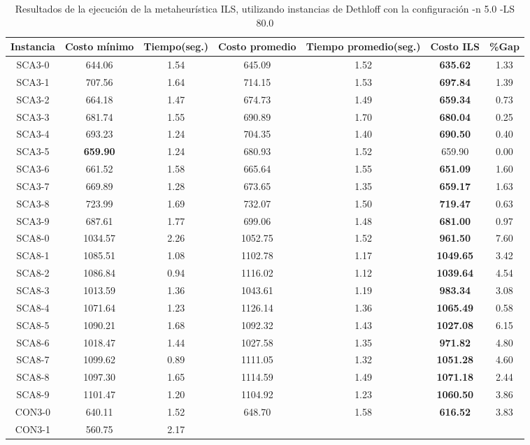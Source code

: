 \begin{table}[ht]
\caption{Resultados de la ejecución de la metaheurística ILS, utilizando instancias de Dethloff con la configuración -n 5.0 -LS 80.0}
\centering
\small
\begin{tabular}{c c c c c c c}
\hline\hline
Instancia & Costo mínimo & Tiempo(seg.) & Costo promedio & Tiempo promedio(seg.) & Costo ILS & \%Gap \\ [0.5ex]
\hline
SCA3-0 & 644.06 & 1.54 & 
645.09 & 1.52 & \bf{635.62} & 
1.33\\SCA3-1 & 707.56 & 1.64 & 
714.15 & 1.53 & \bf{697.84} & 
1.39\\SCA3-2 & 664.18 & 1.47 & 
674.73 & 1.49 & \bf{659.34} & 
0.73\\SCA3-3 & 681.74 & 1.55 & 
690.89 & 1.70 & \bf{680.04} & 
0.25\\SCA3-4 & 693.23 & 1.24 & 
704.35 & 1.40 & \bf{690.50} & 
0.40\\SCA3-5 & \bf{659.90} & 1.24 & 
680.93 & 1.52 & 659.90 & 0.00\\
SCA3-6 & 661.52 & 1.58 & 
665.64 & 1.55 & \bf{651.09} & 
1.60\\SCA3-7 & 669.89 & 1.28 & 
673.65 & 1.35 & \bf{659.17} & 
1.63\\SCA3-8 & 723.99 & 1.69 & 
732.07 & 1.50 & \bf{719.47} & 
0.63\\SCA3-9 & 687.61 & 1.77 & 
699.06 & 1.48 & \bf{681.00} & 
0.97\\SCA8-0 & 1034.57 & 2.26 & 
1052.75 & 1.52 & \bf{961.50} & 
7.60\\SCA8-1 & 1085.51 & 1.08 & 
1102.78 & 1.17 & \bf{1049.65} & 
3.42\\SCA8-2 & 1086.84 & 0.94 & 
1116.02 & 1.12 & \bf{1039.64} & 
4.54\\SCA8-3 & 1013.59 & 1.36 & 
1043.61 & 1.19 & \bf{983.34} & 
3.08\\SCA8-4 & 1071.64 & 1.23 & 
1126.14 & 1.36 & \bf{1065.49} & 
0.58\\SCA8-5 & 1090.21 & 1.68 & 
1092.32 & 1.43 & \bf{1027.08} & 
6.15\\SCA8-6 & 1018.47 & 1.44 & 
1027.58 & 1.35 & \bf{971.82} & 
4.80\\SCA8-7 & 1099.62 & 0.89 & 
1111.05 & 1.32 & \bf{1051.28} & 
4.60\\SCA8-8 & 1097.30 & 1.65 & 
1114.59 & 1.49 & \bf{1071.18} & 
2.44\\SCA8-9 & 1101.47 & 1.20 & 
1104.92 & 1.23 & \bf{1060.50} & 
3.86\\CON3-0 & 640.11 & 1.52 & 
648.70 & 1.58 & \bf{616.52} & 
3.83\\CON3-1 & 560.75 & 2.17 & 

\end{tabular}
\end{table}
